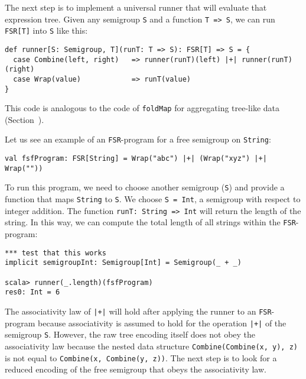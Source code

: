 The next step is to implement a universal runner that will evaluate
that expression tree. Given any semigroup \lstinline!S!
and a function \lstinline!T => S!,
we can run \lstinline!FSR[T]!
into \lstinline!S! like
this:
\begin{lstlisting}
def runner[S: Semigroup, T](runT: T => S): FSR[T] => S = {
  case Combine(left, right)   => runner(runT)(left) |+| runner(runT)(right)
  case Wrap(value)            => runT(value)
}
\end{lstlisting}
This code is analogous to the code of \lstinline!foldMap!
for aggregating tree-like data (Section~).

Let us see an example of an \lstinline!FSR!-program
for a free semigroup on \lstinline!String!:
\begin{lstlisting}
val fsfProgram: FSR[String] = Wrap("abc") |+| (Wrap("xyz") |+| Wrap(""))
\end{lstlisting}
 To run this program, we need to choose another semigroup (\lstinline!S!)
and provide a function that maps \lstinline!String!
to \lstinline!S!. We choose
\lstinline!S = Int!, a
semigroup with respect to integer addition. The function \lstinline!runT: String => Int!
will return the length of the string. In this way, we can compute
the total length of all strings within the \lstinline!FSR!-program:
\begin{lstlisting}
*** test that this works
implicit semigroupInt: Semigroup[Int] = Semigroup(_ + _)

scala> runner(_.length)(fsfProgram)
res0: Int = 6
\end{lstlisting}
The associativity law of \lstinline!|+|!
will hold after applying the runner to an \lstinline!FSR!-program
because associativity is assumed to hold for the operation \lstinline!|+|!
of the semigroup \lstinline!S!.
However, the raw tree encoding itself does not obey the associativity
law because the nested data structure \lstinline!Combine(Combine(x, y), z)!
is not equal to \lstinline!Combine(x, Combine(y, z))!.
The next step is to look for a reduced encoding of the free semigroup
that obeys the associativity law.

